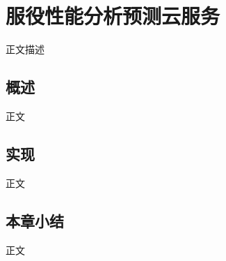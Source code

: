 \chapter{服役性能分析预测云服务}
\label{chap:service}

正文描述

\section{概述}

正文




\section{实现}

正文




\section{本章小结}

正文